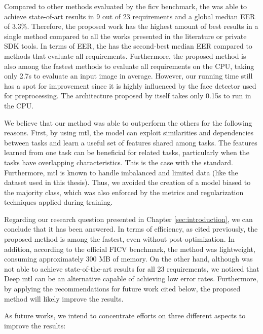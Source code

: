 Compared to other methods evaluated by the \acs{ficv} benchmark, the \methodname was able to achieve state-of-art results in 9 out of 23 requirements and a global median EER of 3.3\%. Therefore, the proposed work has the highest amount of best results in a single method compared to all the works presented in the literature or private SDK tools. In terms of EER, the \methodname has the second-best median EER compared to methods that evaluate all requirements. Furthermore, the proposed method is also among the fastest methods to evaluate all requirements on the CPU, taking only 2.7s to evaluate an input image in average. However, our running time still has a spot for improvement since it is highly influenced by the face detector used for preprocessing. The architecture proposed by itself takes only 0.15s to run in the CPU.

We believe that our method was able to outperform the others for the following reasons. First, by using \acs{mtl}, the model can exploit similarities and dependencies between tasks and learn a useful set of features shared among tasks. The features learned from one task can be beneficial for related tasks, particularly when the tasks have overlapping characteristics. This is the case with the \icao standard. Furthermore, \acs{mtl} is known to handle imbalanced and limited data (like the dataset used in this thesis). Thus, we avoided the creation of a model biased to the majority class, which was also enforced by the metrics and regularization techniques applied during training.

Regarding our research question presented in Chapter \ref{sec:introduction}, we can conclude that it has been answered. In terms of efficiency, as cited previously, the proposed method is among the fastest, even without post-optimization. In addition, according to the official FICV benchmark, the method was lightweight, consuming approximately 300 MB of memory. On the other hand, although \methodname was not able to achieve state-of-the-art results for all 23 requirements, we noticed that Deep \acl{mtl} can be an alternative capable of achieving low error rates. Furthermore, by applying the recommendations for future work cited below, the proposed method will likely improve the results.

As future works, we intend to concentrate efforts on three different aspects to improve the results:

